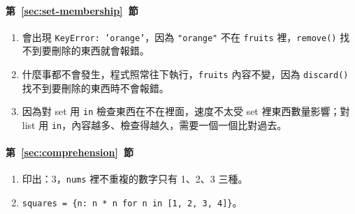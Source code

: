\paragraph{第~\ref{sec:set-membership}~節}
\begin{enumerate}
\item 會出現 \texttt{KeyError: 'orange'}，因為 \texttt{"orange"} 不在 \texttt{fruits}
裡，\texttt{remove()} 找不到要刪除的東西就會報錯。
\item 什麼事都不會發生，程式照常往下執行，\texttt{fruits} 內容不變，因為
\texttt{discard()} 找不到要刪除的東西時不會報錯。
\item 因為對 set 用 \texttt{in} 檢查東西在不在裡面，速度不太受 set 裡東西數量影響；對
list 用 \texttt{in}，內容越多、檢查得越久，需要一個一個比對過去。
\end{enumerate}

\paragraph{第~\ref{sec:comprehension}~節}
\begin{enumerate}
\item 印出：3，\texttt{nums} 裡不重複的數字只有 1、2、3 三種。
\item \texttt{squares = \{n: n * n for n in [1, 2, 3, 4]\}}。
\end{enumerate}

